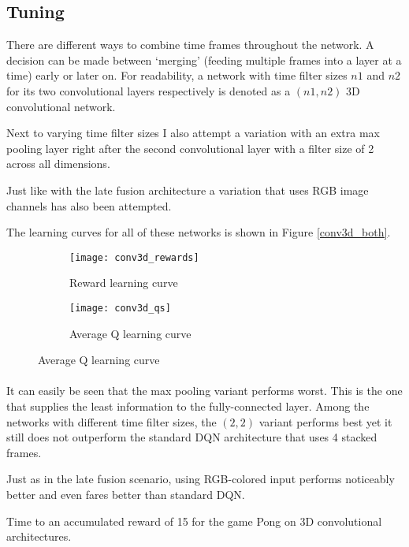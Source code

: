 \subsection{Tuning}
\label{sub:conv3d_tuning}
There are different ways to combine time frames throughout the network.
A decision can be made between `merging'
(feeding multiple frames into a layer at a time)
early or later on.
For readability,
a network with time filter sizes
$n1$ and $n2$ for its two convolutional layers respectively
is denoted as a $(n1, n2)$ 3D convolutional network.

Next to varying time filter sizes
I also attempt a variation with an extra max pooling layer
right after the second convolutional layer
with a filter size of 2 across all dimensions.

Just like with the late fusion architecture
a variation that uses RGB image channels has also been attempted.

The learning curves for all of these networks
is shown in Figure \ref{conv3d_both}.

\begin{figure}[htpb]
  \centering
  \begin{subfigure}[t]{.49\linewidth}
    \caption{Reward learning curve}
    \texttt{[image: conv3d\_rewards]}
  \end{subfigure}
  \begin{subfigure}[t]{.49\linewidth}
    \caption{Average Q learning curve}
    \texttt{[image: conv3d\_qs]}
  \end{subfigure}
  \label{fig:conv3d_both}
\end{figure}

\paragraph{}
It can easily be seen that the max pooling variant
performs worst.
This is the one that supplies the least information
to the fully-connected layer.
Among the networks with different time filter sizes,
the $(2,2)$ variant performs best
yet it still does not outperform
the standard DQN architecture that uses 4 stacked frames.

Just as in the late fusion scenario,
using RGB-colored input performs noticeably better
and even fares better than standard DQN.

\begin{table}
  \center
  
  \caption{
    Time to an accumulated reward of 15
    for the game Pong
    on 3D convolutional architectures.
  }

\end{table}

